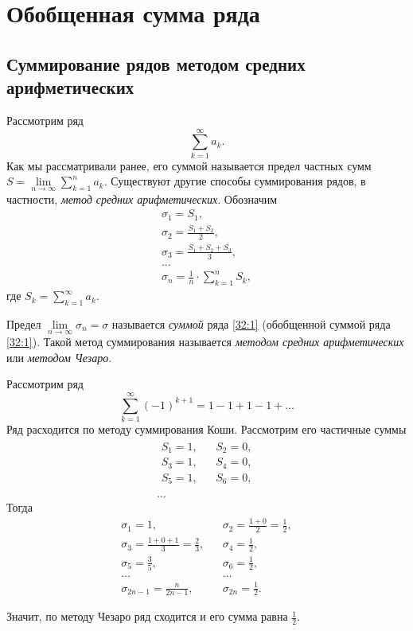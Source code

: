 \documentclass[../../main.tex]{subfiles}
\begin{document}
\section{Обобщенная сумма ряда}

\subsection{Суммирование рядов методом средних арифметических}

Рассмотрим ряд
\begin{equation}
 \sum\limits_{k=1}^\infty a_k.
 \label{32:1}
\end{equation}
Как мы рассматривали ранее, его суммой называется предел частных сумм $S = \lim\limits_{n\to\infty} \sum\limits_{k=1}^n a_k$. Существуют другие способы суммирования рядов, в частности, \emph{метод средних арифметических}. Обозначим 
\begin{gather*}
 \sigma_1 = S_1, \\
 \sigma_2 = \frac{S_1 + S_2}2, \\
 \sigma_3 = \frac{S_1 + S_2 + S_3}3, \\
 \dots\\
 \sigma_n = \frac1n\cdot\sum\limits_{k=1}^n S_k,
\end{gather*}
где $S_k = \sum\limits_{k=1}^\infty a_k$.

Предел $\lim\limits_{n\to\infty} \sigma_n = \sigma$ называется \emph{суммой} ряда \eqref{32:1} (обобщенной суммой ряда \eqref{32:1}). Такой метод суммирования называется \emph{методом средних арифметических} или \emph{методом Чезаро}.

\begin{exmp}
 Рассмотрим ряд
 \[\sum\limits_{k=1}^\infty (-1)^{k+1} = 1-1+1-1+\dots\]
 Ряд расходится по методу суммирования Коши. Рассмотрим его частичные суммы
 \begin{gather*}
  \begin{array}{lll}
   S_1 = 1,&& S_2 = 0, \\
   S_3 = 1,&& S_4 = 0, \\
   S_5 = 1,&& S_6 = 0, \\
  \end{array} \\
  \dots
 \end{gather*}
Тогда
\[
 \begin{array}{lll}
 \sigma_1 = 1,&&
 \sigma_2 = \frac{1+0}2 = \frac12, \\
 \sigma_3 = \frac{1+0+1}3 = \frac23,&&
 \sigma_4 = \frac12, \\
 \sigma_5 = \frac35,&&
 \sigma_6 = \frac12, \\
 \dots&& \dots \\
 \sigma_{2n-1} = \frac{n}{2n-1},&& \sigma_{2n}=\frac12.
 \end{array}
\]

Значит, по методу Чезаро ряд сходится и его сумма равна $\frac12$.
\end{exmp}
\end{document}
